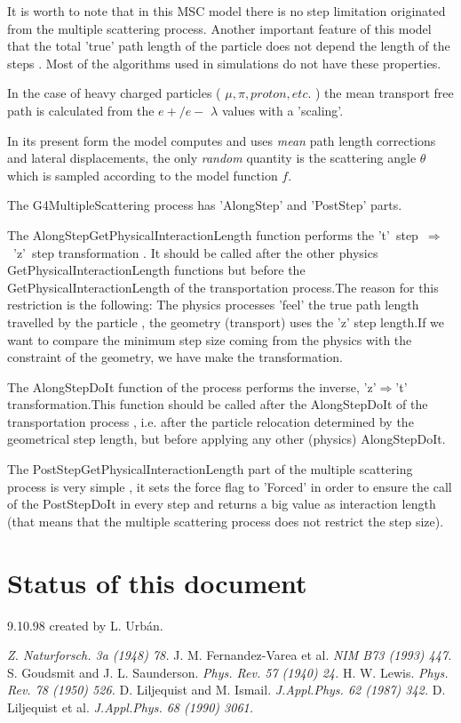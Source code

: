  It is worth to note that in this MSC model there is no step limitation
 originated from the multiple scattering process. Another important feature
 of this model
 that the total 'true' path length of the particle does not depend the
 length of the steps . Most of the algorithms used in simulations do not have
 these properties.
  
 In the case of heavy charged particles ( \(\mu,\pi,proton,etc.\) ) the
 mean transport free path is calculated from the \(e+/e-\)  \(\lambda\) values
 with a 'scaling'.

 In its present form the model computes and uses {\em mean}  path length
 corrections and lateral displacements, the only {\em random} quantity is
 the scattering angle \(\theta\) which is sampled according to the model
 function \( f \).   

  The G4MultipleScattering process has  'AlongStep' and  'PostStep'
parts.

  The AlongStepGetPhysicalInteractionLength function performs the\linebreak
 \mbox{'t' step \(\Rightarrow\) 'z' step} transformation . It should be called after the
other physics GetPhysicalInteractionLength functions but before
the GetPhysicalInteractionLength of the transportation process.The
reason for this restriction is the following: The physics processes
'feel' the true path length travelled by the particle , the geometry
(transport) uses the 'z' step length.If we want to compare the minimum
step size coming from the physics with the constraint of the geometry,
we have make the transformation.

  The AlongStepDoIt function of the process performs the inverse,
 'z'\(\Rightarrow\)'t' transformation.This function should be called after the 
AlongStepDoIt of the transportation process , i.e. after the particle
relocation determined by the geometrical step length, but before applying
any other (physics) AlongStepDoIt.

  The PostStepGetPhysicalInteractionLength part of the multiple
scattering process is very simple , it sets the force flag to 'Forced'
in order to ensure the call of the PostStepDoIt in every step and
returns a big value as interaction length (that means that the multiple
scattering process does not restrict the step size).

\section{Status of this document}
  9.10.98  created by L. Urb\'an.

\begin{thebibliography}{99}
   {\em Z. Naturforsch. 3a (1948) 78. }
J. M. Fernandez-Varea et al.
   {\em NIM B73 (1993) 447.}
S. Goudsmit and J. L. Saunderson.
   {\em Phys. Rev. 57 (1940) 24. }
 H. W. Lewis. 
   {\em Phys. Rev. 78 (1950) 526. }
 D. Liljequist and M. Ismail.
   {\em J.Appl.Phys. 62 (1987) 342. }
 D. Liljequist et al.
   {\em J.Appl.Phys. 68 (1990) 3061. }
\end{thebibliography}
